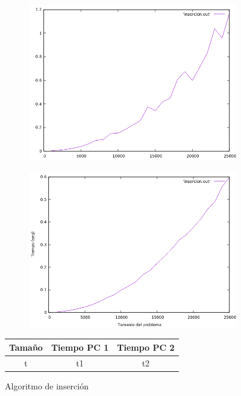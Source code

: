 \documentclass[12pt,spanish]{article}
\begin{document}
\begin{figure}[H]
\centering
\begin{subfigure}[b]{0.45\textwidth}
\includegraphics[scale=0.45]{empirica_insercion.png}
\caption{}
\end{subfigure}
\quad
\begin{subfigure}[b]{0.45\textwidth}
\includegraphics[scale=0.45]{empirica_insercion_2.png}
\caption{}
\end{subfigure}
\begin{tabular}{|c|c|c|}
\hline
\textbf{Tamaño} & \textbf{Tiempo PC 1} & \textbf{Tiempo PC 2} \\
\hline
t & t1 & t2 \\
\hline
\end{tabular}
\caption{Algoritmo de inserción}
\end{figure}
\end{document}
